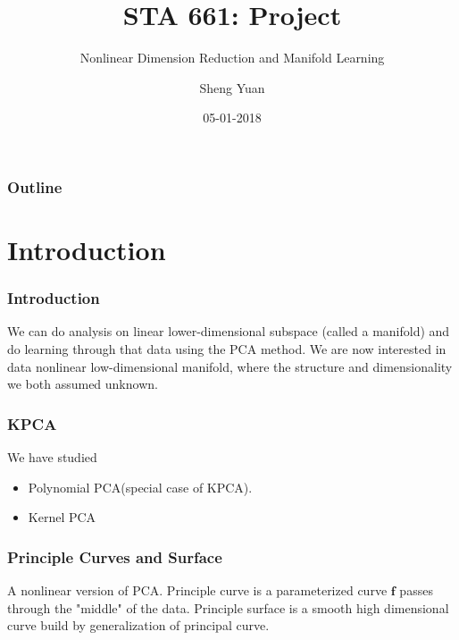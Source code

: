 \documentclass{beamer}
\title{STA 661: Project}
\subtitle{Nonlinear Dimension Reduction and Manifold Learning}
\author{Sheng Yuan}\institute{University of Kentucky}
\date{05-01-2018}
\begin{document}

{

\begin{withoutheadline}
	\begin{frame}
        \titlepage
    \end{frame} 
\end{withoutheadline}
} 



{
   \begin{frame}
       \frametitle{Outline}
       \tableofcontents
   \end{frame}
}




\section{Introduction}

\begin{frame}

\frametitle{Introduction}
We can do analysis on linear lower-dimensional subspace (called a manifold) and do learning through that
data using the PCA method. \newline \newline
We are now interested in data nonlinear low-dimensional manifold, where the structure and dimensionality we both assumed unknown.
\end{frame}

\begin{frame}

\frametitle{KPCA}

We have studied 
\begin{itemize}
  \item Polynomial PCA(special case of KPCA).
  \item Kernel PCA
  \end{itemize}
\end{frame}

\begin{frame}
\frametitle{Principle Curves and Surface}
A nonlinear version of PCA.\newline
Principle curve is a parameterized curve $\textbf{f}$ passes through the "middle" of the data.\newline 
Principle surface is a smooth high dimensional curve build by generalization of principal curve.\newline 
\end{frame}
\end{document}
